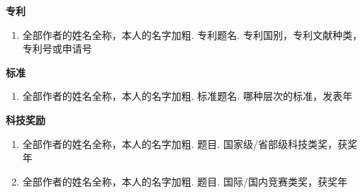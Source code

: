 \begin{publications}


\textbf{专\hspace{2em}利}
\renewcommand{\labelenumi}{[\arabic{enumi}]}
\begin{enumerate}
\item 全部作者的姓名全称，本人的名字加粗. 专利题名. 专利国别，专利文献种类，专利号或申请号
\end{enumerate}
\textbf{标\hspace{2em}准}
\renewcommand{\labelenumi}{[\arabic{enumi}]}
\begin{enumerate}
\item 全部作者的姓名全称，本人的名字加粗. 标准题名. 哪种层次的标准，发表年
\end{enumerate}
\textbf{科技奖励}
\renewcommand{\labelenumi}{[\arabic{enumi}]}
\begin{enumerate}
\item 全部作者的姓名全称，本人的名字加粗. 题目. 国家级/省部级科技类奖，获奖年
\item 全部作者的姓名全称，本人的名字加粗. 题目. 国际/国内竞赛类奖，获奖年
\end{enumerate}
\end{publications}
